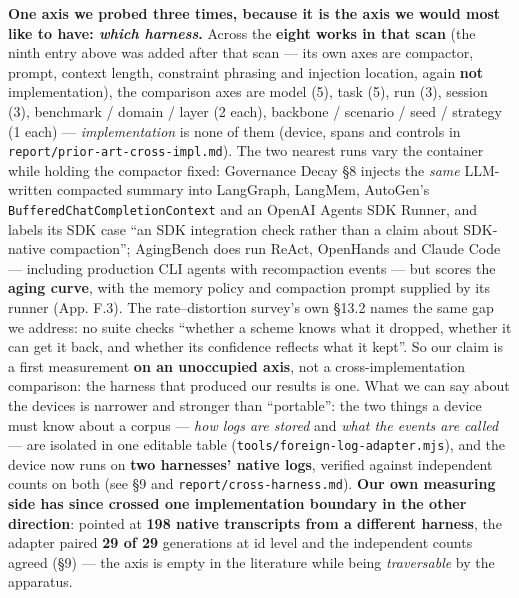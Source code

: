 \documentclass[
]{article}
\newcounter{none} %
\begin{document}
\textbf{One axis we probed three times, because it is the axis we would
most like to have: \emph{which harness}.} Across the \textbf{eight works
in that scan} (the ninth entry above was added after that scan --- its
own axes are compactor, prompt, context length, constraint phrasing and
injection location, again \textbf{not} implementation), the comparison
axes are model (5), task (5), run (3), session (3), benchmark / domain /
layer (2 each), backbone / scenario / seed / strategy (1 each) ---
\emph{implementation} is none of them (device, spans and controls in
\texttt{report/prior-art-cross-impl.md}). The two nearest runs vary the
container while holding the compactor fixed: Governance Decay §8 injects
the \emph{same} LLM-written compacted summary into LangGraph, LangMem,
AutoGen's \texttt{BufferedChatCompletionContext} and an OpenAI Agents
SDK Runner, and labels its SDK case ``an SDK integration check rather
than a claim about SDK-native compaction''; AgingBench does run ReAct,
OpenHands and Claude Code --- including production CLI agents with
recompaction events --- but scores the \textbf{aging curve}, with the
memory policy and compaction prompt supplied by its runner (App. F.3).
The rate--distortion survey's own §13.2 names the same gap we address:
no suite checks ``whether a scheme knows what it dropped, whether it can
get it back, and whether its confidence reflects what it kept''. So our
claim is a first measurement \textbf{on an unoccupied axis}, not a
cross-implementation comparison: the harness that produced our results
is one. What we can say about the devices is narrower and stronger than
``portable'': the two things a device must know about a corpus ---
\emph{how logs are stored} and \emph{what the events are called} --- are
isolated in one editable table (\texttt{tools/foreign-log-adapter.mjs}),
and the device now runs on \textbf{two harnesses' native logs}, verified
against independent counts on both (see §9 and
\texttt{report/cross-harness.md}). \textbf{Our own measuring side has
since crossed one implementation boundary in the other direction}:
pointed at \textbf{198 native transcripts from a different harness}, the
adapter paired \textbf{29 of 29} generations at id level and the
independent counts agreed (§9) --- the axis is empty in the literature
while being \emph{traversable} by the apparatus.
\end{document}
